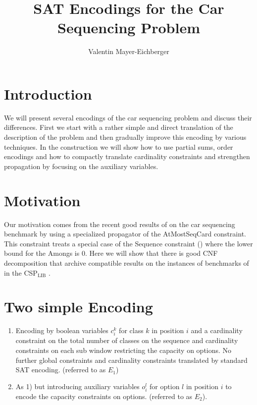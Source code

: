\documentclass[]{llncs}
\author{Valentin Mayer-Eichberger}
\institute{NICTA \\ University of New South Wales \\
\email{valentin.mayer-eichberger@nicta.com.au}}
\title{SAT Encodings for the Car Sequencing Problem}
\newcommand{\AtMostSeqCard}{AtMostSeqCard }
\begin{document}
 \maketitle

\section{Introduction}

We will present several encodings of the car sequencing problem and
discuss their differences. First we start with a rather simple and
direct translation of the description of the problem and then gradually
improve this encoding by various techniques. In the construction we will
show how to use partial sums, order encodings and how to compactly
translate cardinality constraints and strengthen propagation by focusing
on the auxiliary variables. 

\section{Motivation}

Our motivation comes from the recent good results of \cite{Siala12} on
the car sequencing benchmark by using a specialized propagator of the
\AtMostSeqCard constraint. This constraint treats a special case of the
Sequence constraint (\cite{Hoeve06}) where the lower bound for the
Amongs is $0$.  Here we will show that there is good  CNF decomposition
that archive compatible results on the instances of benchmarks of in the
CSP$_{\mbox{LIB}}$ \cite{Gent99}. 

\section{Two simple Encoding}

\begin{enumerate}
    \item Encoding by boolean variables $c^k_{i}$ for class $k$ in
        position $i$ and a cardinality constraint on the total number of
        classes on the sequence and cardinality constraints on each sub
        window restricting the capacity on options. No further global
        constraints and cardinality constraints translated by standard
        SAT encoding. (referred to as $E_1$)
    \item As 1) but introducing auxiliary variables $o^l_{i}$ for option
        $l$ in position $i$ to encode the capacity constraints on options.
        (referred to as $E_2$). 
\end{enumerate}
\end{document}
